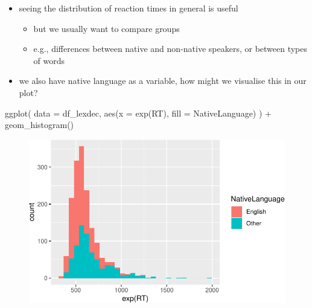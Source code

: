 \documentclass[
  letterpaper,
  DIV=11]{scrartcl}
\newenvironment{Shaded}{\begin{snugshade}}{\end{snugshade}}
\newcommand{\AttributeTok}[1]{\textcolor[rgb]{0.40,0.45,0.13}{#1}}
\newcommand{\FunctionTok}[1]{\textcolor[rgb]{0.28,0.35,0.67}{#1}}
\newcommand{\NormalTok}[1]{\textcolor[rgb]{0.00,0.23,0.31}{#1}}
\newcommand{\SpecialCharTok}[1]{\textcolor[rgb]{0.37,0.37,0.37}{#1}}
\providecommand{\tightlist}{%
  \setlength{\itemsep}{0pt}\setlength{\parskip}{0pt}}\usepackage{longtable,booktabs,array}
\theoremstyle{definition}
\theoremstyle{remark}
\begin{document}
\begin{itemize}
\tightlist
\item
  seeing the distribution of reaction times in general is useful

  \begin{itemize}
  \tightlist
  \item
    but we usually want to compare groups
  \item
    e.g., differences between native and non-native speakers, or between
    types of words
  \end{itemize}
\item
  we also have native language as a variable, how might we visualise
  this in our plot?
\end{itemize}

\begin{Shaded}
\begin{Highlighting}[]
\FunctionTok{ggplot}\NormalTok{(}
  \AttributeTok{data =}\NormalTok{ df\_lexdec,}
  \FunctionTok{aes}\NormalTok{(}\AttributeTok{x =} \FunctionTok{exp}\NormalTok{(RT), }\AttributeTok{fill =}\NormalTok{ NativeLanguage)}
\NormalTok{) }\SpecialCharTok{+}
  \FunctionTok{geom\_histogram}\NormalTok{()}
\end{Highlighting}
\end{Shaded}

\begin{figure}[H]

{\centering \includegraphics{_intro_r_slides_files/figure-pdf/unnamed-chunk-20-1.pdf}

}

\end{figure}
\end{document}
